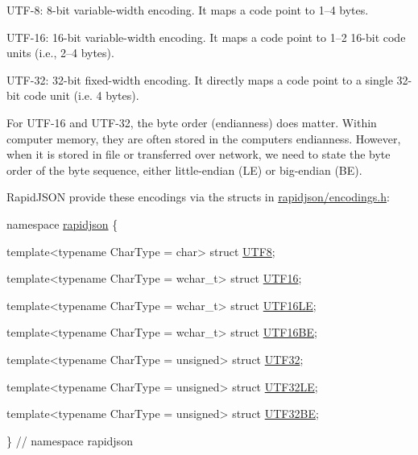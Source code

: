 \begin{DoxyItemize}
\item U\+T\+F-\/8\+: 8-\/bit variable-\/width encoding. It maps a code point to 1–4 bytes.
\item U\+T\+F-\/16\+: 16-\/bit variable-\/width encoding. It maps a code point to 1–2 16-\/bit code units (i.\+e., 2–4 bytes).
\item U\+T\+F-\/32\+: 32-\/bit fixed-\/width encoding. It directly maps a code point to a single 32-\/bit code unit (i.\+e. 4 bytes).
\end{DoxyItemize}

For U\+T\+F-\/16 and U\+T\+F-\/32, the byte order (endianness) does matter. Within computer memory, they are often stored in the computer\textquotesingle{}s endianness. However, when it is stored in file or transferred over network, we need to state the byte order of the byte sequence, either little-\/endian (LE) or big-\/endian (BE).

Rapid\+J\+S\+ON provide these encodings via the structs in {\ttfamily \hyperlink{encodings_8h_source}{rapidjson/encodings.\+h}}\+:


\begin{DoxyCode}
\textcolor{keyword}{namespace }\hyperlink{namespacerapidjson}{rapidjson} \{

\textcolor{keyword}{template}<\textcolor{keyword}{typename} CharType = \textcolor{keywordtype}{char}>
\textcolor{keyword}{struct }\hyperlink{struct_u_t_f8}{UTF8};

\textcolor{keyword}{template}<\textcolor{keyword}{typename} CharType = \textcolor{keywordtype}{wchar\_t}>
\textcolor{keyword}{struct }\hyperlink{struct_u_t_f16}{UTF16};

\textcolor{keyword}{template}<\textcolor{keyword}{typename} CharType = \textcolor{keywordtype}{wchar\_t}>
\textcolor{keyword}{struct }\hyperlink{struct_u_t_f16_l_e}{UTF16LE};

\textcolor{keyword}{template}<\textcolor{keyword}{typename} CharType = \textcolor{keywordtype}{wchar\_t}>
\textcolor{keyword}{struct }\hyperlink{struct_u_t_f16_b_e}{UTF16BE};

\textcolor{keyword}{template}<\textcolor{keyword}{typename} CharType = \textcolor{keywordtype}{unsigned}>
\textcolor{keyword}{struct }\hyperlink{struct_u_t_f32}{UTF32};

\textcolor{keyword}{template}<\textcolor{keyword}{typename} CharType = \textcolor{keywordtype}{unsigned}>
\textcolor{keyword}{struct }\hyperlink{struct_u_t_f32_l_e}{UTF32LE};

\textcolor{keyword}{template}<\textcolor{keyword}{typename} CharType = \textcolor{keywordtype}{unsigned}>
\textcolor{keyword}{struct }\hyperlink{struct_u_t_f32_b_e}{UTF32BE};

\} \textcolor{comment}{// namespace rapidjson}
\end{DoxyCode}


